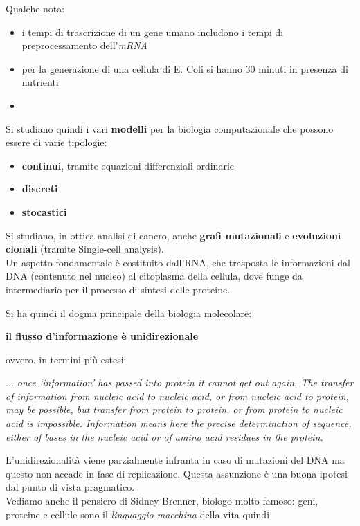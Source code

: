 \documentclass[a4paper,12pt, oneside]{book}
\begin{document}
Qualche nota:
\begin{itemize}
  \item i tempi di trascrizione di un gene umano includono i tempi di
  preprocessamento dell'\textit{mRNA}
  \item per la generazione di una cellula di E. Coli si hanno 30 minuti in
  presenza di nutrienti
  \item 
\end{itemize}
Si studiano quindi i vari \textbf{modelli} per la biologia computazionale che
possono essere di varie tipologie:
\begin{itemize}
  \item \textbf{continui}, tramite equazioni differenziali ordinarie
  \item \textbf{discreti}
  \item \textbf{stocastici}
\end{itemize}
Si studiano, in ottica analisi di cancro, anche \textbf{grafi mutazionali} e
\textbf{evoluzioni clonali} (tramite Single-cell analysis).\\
Un aspetto fondamentale è costituito dall'RNA, che trasposta le informazioni dal
DNA (contenuto nel nucleo) al citoplasma della cellula, dove funge da
intermediario per il processo di sintesi delle proteine.
\begin{teorema}
  Si ha quindi il dogma principale della biologia molecolare:
  \begin{center}
    \textbf{il flusso d'informazione è unidirezionale}
  \end{center}
  ovvero, in termini più estesi:
  \begin{center}
    \emph{$\ldots$ once `information' has passed into protein it cannot get out
      again. The transfer of information from nucleic acid to nucleic acid, or
      from nucleic acid to protein, may be possible, but transfer from protein
      to protein, or from protein to nucleic acid is impossible.  Information
      means here the precise determination of sequence, either of bases in the
      nucleic acid or of amino acid residues in the protein.}  
  \end{center}
\end{teorema}
L'unidirezionalità viene parzialmente infranta in caso di mutazioni del DNA ma
questo non accade in fase di replicazione. Questa assunzione è una buona ipotesi
dal punto di vista pragmatico.\\
Vediamo anche il pensiero di Sidney Brenner, biologo molto famoso:
geni, proteine e cellule sono il \textit{linguaggio macchina} della vita quindi
\end{document}
